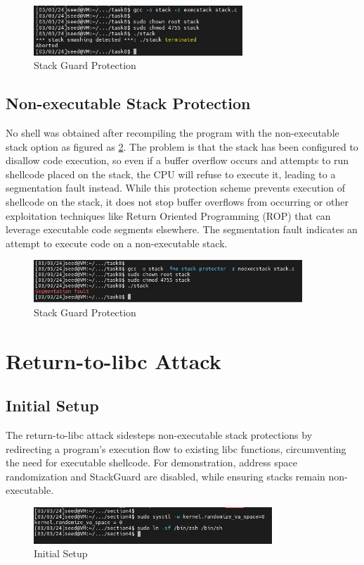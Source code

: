 \documentclass[a4paper,11pt]{article}
\begin{document}
\begin{figure}[h]
    \centering
       \includegraphics[width=0.7\textwidth]{figures/task13/task13.png}
    \caption{Stack Guard Protection}\label{fig:task13}
\end{figure}

\subsection{Non-executable Stack Protection}
No shell was obtained after recompiling the program with the non-executable stack option as figured as \ref{fig:task14}. The problem is that the stack has been configured to disallow code execution, so even if a buffer overflow occurs and attempts to run shellcode placed on the stack, the CPU will refuse to execute it, leading to a segmentation fault instead. While this protection scheme prevents execution of shellcode on the stack, it does not stop buffer overflows from occurring or other exploitation techniques like Return Oriented Programming (ROP) that can leverage executable code segments elsewhere. The segmentation fault indicates an attempt to execute code on a non-executable stack.
\begin{figure}[h]
    \centering
       \includegraphics[width=0.9\textwidth]{figures/task14/task14.png}
    \caption{Stack Guard Protection}\label{fig:task14}
\end{figure}

\bigskip
\bigskip
\section{Return-to-libc Attack}
\subsection{Initial Setup}
The return-to-libc attack sidesteps non-executable stack protections by redirecting a program's execution flow to existing libc functions, circumventing the need for executable shellcode. For demonstration, address space randomization and StackGuard are disabled, while ensuring stacks remain non-executable.
\begin{figure}[h]
    \centering
       \includegraphics[width=0.8\textwidth]{figures/task15/task15.png}
    \caption{Initial Setup}\label{fig:task15}
\end{figure}
\end{document}
